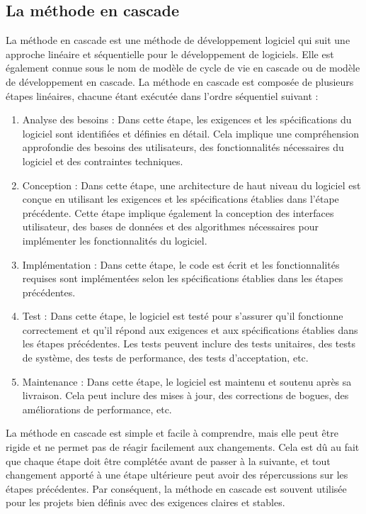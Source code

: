 \subsection{La méthode en cascade}\label{subsec:methode-en-cascade}
La méthode en cascade est une méthode de développement logiciel qui suit une approche linéaire et séquentielle pour le développement de logiciels. Elle est également connue sous le nom de modèle de cycle de vie en cascade ou de modèle de développement en cascade. La méthode en cascade est composée de plusieurs étapes linéaires, chacune étant exécutée dans l'ordre séquentiel suivant :
\begin{enumerate}
    \item Analyse des besoins : Dans cette étape, les exigences et les spécifications du logiciel sont identifiées et définies en détail. Cela implique une compréhension approfondie des besoins des utilisateurs, des fonctionnalités nécessaires du logiciel et des contraintes techniques.
    \item Conception : Dans cette étape, une architecture de haut niveau du logiciel est conçue en utilisant les exigences et les spécifications établies dans l'étape précédente. Cette étape implique également la conception des interfaces utilisateur, des bases de données et des algorithmes nécessaires pour implémenter les fonctionnalités du logiciel.
    \item Implémentation : Dans cette étape, le code est écrit et les fonctionnalités requises sont implémentées selon les spécifications établies dans les étapes précédentes.
    \item Test : Dans cette étape, le logiciel est testé pour s'assurer qu'il fonctionne correctement et qu'il répond aux exigences et aux spécifications établies dans les étapes précédentes. Les tests peuvent inclure des tests unitaires, des tests de système, des tests de performance, des tests d'acceptation, etc.
    \item Maintenance : Dans cette étape, le logiciel est maintenu et soutenu après sa livraison. Cela peut inclure des mises à jour, des corrections de bogues, des améliorations de performance, etc.
\end{enumerate}

La méthode en cascade est simple et facile à comprendre, mais elle peut être rigide et ne permet pas de réagir facilement aux changements. Cela est dû au fait que chaque étape doit être complétée avant de passer à la suivante, et tout changement apporté à une étape ultérieure peut avoir des répercussions sur les étapes précédentes. Par conséquent, la méthode en cascade est souvent utilisée pour les projets bien définis avec des exigences claires et stables.

